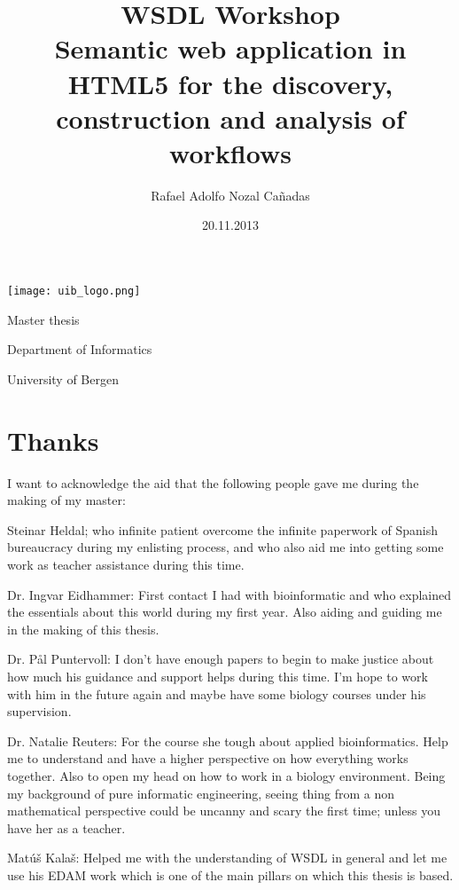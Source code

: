 \documentclass[a4paper,10pt]{article}
\title{WSDL Workshop \\ \vspace{5 mm} \large Semantic web application in HTML5 for the discovery, construction and analysis of workflows}
\author{Rafael Adolfo Nozal Cañadas}
\date{20.11.2013}
\begin{document}
\begin{titlepage}
\maketitle
\begin{center}
\vspace{15 mm}
\texttt{[image: uib\_logo.png]}
\vspace{15 mm}

Master thesis

Department of Informatics

University of Bergen
\end{center}
\end{titlepage}

\section{Thanks}

I want to acknowledge the aid that the following people gave me during the making of my master:\vspace{3 mm}

Steinar Heldal; who infinite patient overcome the infinite paperwork of Spanish bureaucracy during my enlisting process, and who also aid me into getting some work as teacher assistance during this time.\vspace{3 mm}

Dr. Ingvar Eidhammer: First contact I had with bioinformatic and who explained the essentials about this world during my first year. Also aiding and guiding me in the making of this thesis.\vspace{3 mm}

Dr. Pål Puntervoll: I don't have enough papers to begin to make justice about how much his guidance and support helps during this time. I'm hope to work with him in the future again and maybe have some biology courses under his supervision.\vspace{3 mm}

Dr. Natalie Reuters: For the course she tough about applied bioinformatics. Help me to understand and have a higher perspective on how everything works together. Also to open my head on how to work in a biology environment. Being my background of pure informatic engineering, seeing thing from a non mathematical perspective could be uncanny and scary the first time; unless you have her as a teacher.\vspace{3 mm}

Matúš Kalaš: Helped me with the understanding of WSDL in general and let me use his EDAM work which is one of the main pillars on which this thesis is based.\vspace{3 mm}
\end{document}
